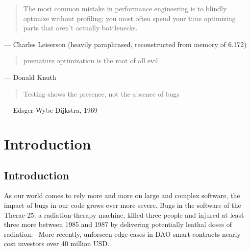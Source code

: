 \begin{quote}
  The most common mistake in performance engineering is to blindly optimize without profiling; you most often spend your time optimizing parts that aren't actually bottlenecks.
\end{quote}
\begin{flushright}
  --- Charles Leiserson (heavily paraphrased, reconstructed from memory of 6.172)
\end{flushright}

\begin{quote}
  premature optimization is the root of all evil
\end{quote}
\begin{flushright}
  --- Donald Knuth
\end{flushright}

\begin{quote}
  Testing shows the presence, not the absence of bugs
\end{quote}
\begin{flushright}
  --- Edsger Wybe Dijkstra, 1969~\cite{naur1969software}
\end{flushright}


\chapter{Introduction}\label{ch:intro}

\section{Introduction}\label{sec:intro:intro}

As our world comes to rely more and more on large and complex software, the impact of bugs in our code grows ever more severe.
Bugs in the software of the Therac-25, a radiation-therapy machine, killed three people and injured at least three more between 1985 and 1987 by delivering potentially leathal doses of radiation.~\cite{Therac}
More recently, unforseen edge-cases in DAO smart-contracts nearly cost investors over 40 million USD.~\cite{DAO2018Guecluetuerk}

